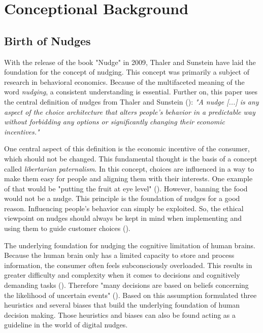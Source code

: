 \section{Conceptional Background}

\subsection{ Birth of Nudges}
With the release of the book "Nudge" in 2009, Thaler and Sunstein have laid the foundation for the concept of nudging. This concept was primarily a subject of research in behavioral economics. Because of the multifaceted meaning of the word \textit{nudging}, a consistent understanding is essential. Further on, this paper uses the central definition of nudges from Thaler and Sunstein (\citeyear[p.6]{thaler_nudge:_2009}): \textit{"A nudge [...] is any aspect of the choice architecture that alters people's behavior in a predictable way without forbidding any options or significantly changing their economic incentives."}

One central aspect of this definition is the economic incentive of the consumer, which should not be changed. This fundamental thought is the basis of a concept called \textit{libertarian paternalism}. In this concept, choices are influenced in a way to make them easy for people and aligning them with their interests. One example of that would be "putting the fruit at eye level" (\cite[p.6]{thaler_nudge:_2009}). However, banning the food would not be a nudge. This principle is the foundation of nudges for a good reason. Influencing people's behavior can simply be exploited. So, the ethical viewpoint on nudges should always be kept in mind when implementing and using them to guide customer choices (\cite{sunstein_nudging_2015}).

The underlying foundation for nudging the cognitive limitation of human brains. Because the human brain only has a limited capacity to store and process information, the consumer often feels subconsciously overloaded. This results in greater difficulty and complexity when it comes to decisions and cognitively demanding tasks (\cite{broniarczyk_decision_2014}). Therefore "many decisions are based on beliefs concerning the likelihood of uncertain events" (\cite[p.1124]{tversky_judgment_1974}). Based on this assumption \cite{tversky_judgment_1974} formulated three heuristics and several biases that build the underlying foundation of human decision making. Those heuristics and biases can also be found acting as a guideline in the world of digital nudges.

